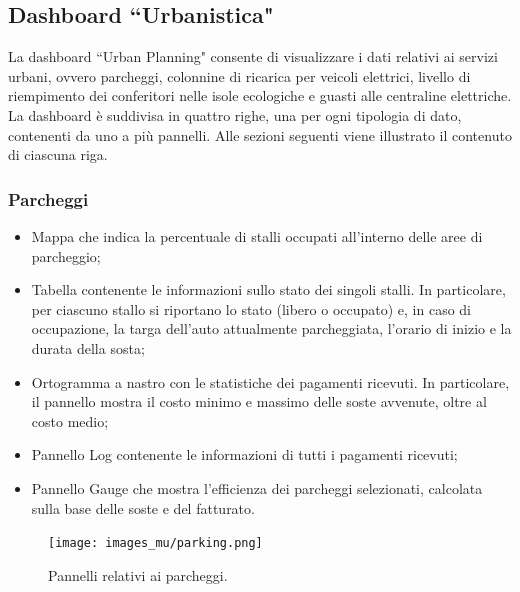\documentclass[8pt]{article}
\begin{document}
\subsection{Dashboard ``Urbanistica"}
La dashboard ``Urban Planning" consente di visualizzare i dati relativi ai servizi urbani, ovvero parcheggi, colonnine di ricarica per veicoli elettrici, livello di riempimento dei conferitori nelle isole ecologiche e guasti alle centraline elettriche. La dashboard è suddivisa in quattro righe, una per ogni tipologia di dato, contenenti da uno a più pannelli. Alle sezioni seguenti viene illustrato il contenuto di ciascuna riga.
\subsubsection{Parcheggi}
\begin{itemize}
\setlength\itemsep{0em}
    \item Mappa che indica la percentuale di stalli occupati all'interno delle aree di parcheggio;
    \item Tabella contenente le informazioni sullo stato dei singoli stalli. In particolare, per ciascuno stallo si riportano lo stato (libero o occupato) e, in caso di occupazione, la targa dell'auto attualmente parcheggiata, l'orario di inizio e la durata della sosta;
    \item Ortogramma a nastro con le statistiche dei pagamenti ricevuti. In particolare, il pannello mostra il costo minimo e massimo delle soste avvenute, oltre al costo medio;
    \item Pannello Log contenente le informazioni di tutti i pagamenti ricevuti;
    \item Pannello Gauge che mostra l'efficienza dei parcheggi selezionati, calcolata sulla base delle soste e del fatturato.
\end{itemize}
\begin{figure}[H]
    \centering
    \texttt{[image: images\_mu/parking.png]}
    \caption{Pannelli relativi ai parcheggi.}
    \label{fig:Pannelli relativi ai parcheggi.}
\end{figure}
\end{document}
